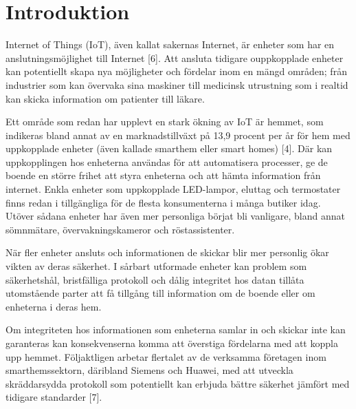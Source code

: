 \documentclass[conference]{IEEEtran}
\begin{document}




%





\section{Introduktion}
Internet of Things (IoT), även kallat sakernas Internet, är enheter som har en anslutningsmöjlighet till Internet [6]. Att ansluta tidigare ouppkopplade enheter kan potentiellt skapa nya möjligheter och fördelar inom en mängd områden; från industrier som kan övervaka sina maskiner till medicinsk utrustning som i realtid kan skicka information om patienter till läkare.

Ett område som redan har upplevt en stark ökning av IoT är hemmet, som indikeras bland annat av en marknadstillväxt på 13,9 procent per år för hem med uppkopplade enheter (även kallade smarthem eller smart homes) [4]. Där kan uppkopplingen hos enheterna användas för att automatisera processer, ge de boende en större frihet att styra enheterna och att hämta information från internet. Enkla enheter som uppkopplade LED-lampor, eluttag och termostater finns redan i tillgängliga för de flesta konsumenterna i många butiker idag. Utöver sådana enheter har även mer personliga börjat bli vanligare, bland annat sömnmätare, övervakningskameror och röstassistenter.

När fler enheter ansluts och informationen de skickar blir mer personlig ökar vikten av deras säkerhet. I sårbart utformade enheter kan problem som säkerhetshål, bristfälliga protokoll och dålig integritet hos datan tillåta utomstående parter att få tillgång till information om de boende eller om enheterna i deras hem.

Om integriteten hos informationen som enheterna samlar in och skickar inte kan garanteras kan konsekvenserna komma att överstiga fördelarna med att koppla upp hemmet. Följaktligen arbetar flertalet av de verksamma företagen inom smarthemssektorn, däribland Siemens och Huawei, med att utveckla skräddarsydda protokoll som potentiellt kan erbjuda bättre säkerhet jämfört med tidigare standarder [7].
\end{document}
